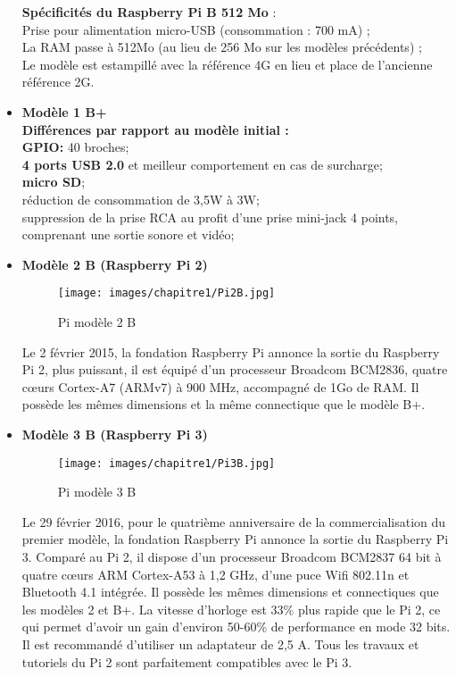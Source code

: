 \documentclass[12pt,a4paper,oneside]{book}
\begin{document}
\begin{itemize}
		\textbf{Spécificités du Raspberry Pi B 512 Mo }:\\
		Prise pour alimentation micro-USB (consommation : 700 mA) ;\\
		La RAM passe à 512Mo (au lieu de 256 Mo sur les modèles précédents) ;\\
		Le modèle est estampillé avec la référence 4G en lieu et place de l'ancienne référence 2G.\\
		
		\item \textbf{Modèle 1 B+}\\
		\textbf{Différences par rapport au modèle initial :}\\
		\textbf{GPIO:} 40 broches;\\
		\textbf{4 ports USB 2.0} et meilleur comportement en cas de surcharge;\\
		\textbf{micro SD};\\
		réduction de consommation de 3,5W à 3W;\\
		suppression de la prise RCA au profit d'une prise mini-jack 4 points, comprenant une sortie sonore et vidéo;\\
		
		\item \textbf{Modèle 2 B (Raspberry Pi 2)}\\
		\begin{figure}[H]
			\begin{center}
				\texttt{[image: images/chapitre1/Pi2B.jpg]}
				\caption{Pi modèle 2 B}
				\label{Types}
			\end{center}
		\end{figure}
		Le 2 février 2015, la fondation Raspberry Pi annonce la sortie du Raspberry Pi 2, plus puissant, il est équipé d'un processeur Broadcom BCM2836, quatre cœurs Cortex-A7 (ARMv7) à 900 MHz, accompagné de 1Go de RAM. Il possède les mêmes dimensions et la même connectique que le modèle B+.\\
		
		\item \textbf{Modèle 3 B (Raspberry Pi 3)}\\
		\begin{figure}[H]
			\begin{center}
				\texttt{[image: images/chapitre1/Pi3B.jpg]}
				\caption{Pi modèle 3 B}
				\label{Types}
			\end{center}
		\end{figure}
		
		Le 29 février 2016, pour le quatrième anniversaire de la commercialisation du premier modèle, la fondation Raspberry Pi annonce la sortie du Raspberry Pi 3. Comparé au Pi 2, il dispose d'un processeur Broadcom BCM2837 64 bit à quatre cœurs ARM Cortex-A53 à 1,2 GHz, d'une puce Wifi 802.11n et Bluetooth 4.1 intégrée. Il possède les mêmes dimensions et connectiques que les modèles 2 et B+. La vitesse d'horloge est 33\% plus rapide que le Pi 2, ce qui permet d'avoir un gain d'environ 50-60\% de performance en mode 32 bits. Il est recommandé d'utiliser un adaptateur de 2,5 A. Tous les travaux et tutoriels du Pi 2 sont parfaitement compatibles avec le Pi 3.\\
		

\end{itemize}
\end{document}
